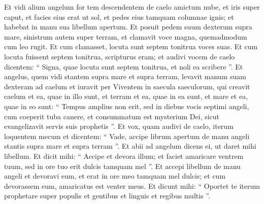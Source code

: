 \begin{biblechapter}
\begin{biblechapter}
\begin{biblechapter}
\begin{biblechapter}
\begin{biblechapter}
\begin{biblechapter}
\begin{biblechapter}
\begin{biblechapter}
\begin{biblechapter}
\begin{biblechapter}
\verse Et vidi alium angelum for tem descendentem de caelo amictum nube, et iris super caput, et facies eius erat ut sol, et pedes eius tamquam columnae ignis; 
 \verse et habebat in manu sua libellum apertum. Et posuit pedem suum dexterum supra mare, sinistrum autem super terram, 
\verse et clamavit voce magna, quemadmodum cum leo rugit. Et cum clamasset, locuta sunt septem tonitrua voces suas. 
\verse Et cum locuta fuissent septem tonitrua, scripturus eram; et audivi vocem de caelo dicentem: “ Signa, quae locuta sunt septem tonitrua, et noli ea scribere ”.
 \verse Et angelus, quem vidi stantem supra mare et supra terram, levavit manum suam dexteram ad caelum 
\verse et iuravit per Viventem in saecula saeculorum, qui creavit caelum et ea, quae in illo sunt, et terram et ea, quae in ea sunt, et mare et ea, quae in eo sunt: “ Tempus amplius non erit, 
\verse sed in diebus vocis septimi angeli, cum coeperit tuba canere, et consummatum est mysterium Dei, sicut evangelizavit servis suis prophetis ”.
 \verse Et vox, quam audivi de caelo, iterum loquentem mecum et dicentem: “ Vade, accipe librum apertum de manu angeli stantis supra mare et supra terram ”. 
\verse Et abii ad angelum dicens ei, ut daret mihi libellum. Et dicit mihi: “ Accipe et devora illum; et faciet amaricare ventrem tuum, sed in ore tuo erit dulcis tamquam mel ”. 
\verse Et accepi libellum de manu angeli et devoravi eum, et erat in ore meo tamquam mel dulcis; et cum devorassem eum, amaricatus est venter meus. 
\verse Et dicunt mihi: “ Oportet te iterum prophetare super populis et gentibus et linguis et regibus multis ”.
 

\end{biblechapter}
\end{biblechapter}
\end{biblechapter}
\end{biblechapter}
\end{biblechapter}
\end{biblechapter}
\end{biblechapter}
\end{biblechapter}
\end{biblechapter}
\end{biblechapter}
